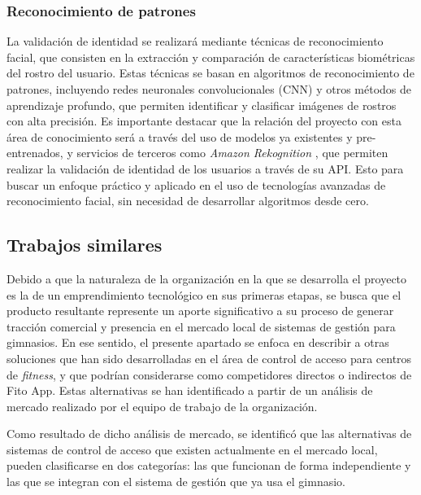 \subsubsection{Reconocimiento de patrones}
La validación de identidad se realizará mediante técnicas de reconocimiento facial, que consisten en la extracción y comparación de características biométricas del rostro del usuario. Estas técnicas se basan en algoritmos de reconocimiento de patrones, incluyendo redes neuronales convolucionales (CNN) y otros métodos de aprendizaje profundo, que permiten identificar y clasificar imágenes de rostros con alta precisión. Es importante destacar que la relación del proyecto con esta área de conocimiento será a través del uso de modelos ya existentes y pre-entrenados, y servicios de terceros como \textit{Amazon Rekognition} \cite{amazon_rekognition}, que permiten realizar la validación de identidad de los usuarios a través de su API. Esto para buscar un enfoque práctico y aplicado en el uso de tecnologías avanzadas de reconocimiento facial, sin necesidad de desarrollar algoritmos desde cero.

\subsection{Trabajos similares}


Debido a que la naturaleza de la organización en la que se desarrolla el proyecto es la de un emprendimiento tecnológico en sus primeras etapas, se busca que el producto resultante represente un aporte significativo a su proceso de generar tracción comercial y presencia en el mercado local de sistemas de gestión para gimnasios. En ese sentido, el presente apartado se enfoca en describir a otras soluciones que han sido desarrolladas en el área de control de acceso para centros de \textit{fitness}, y que podrían considerarse como competidores directos o indirectos de Fito App. Estas alternativas se han identificado a partir de un análisis de mercado realizado por el equipo de trabajo de la organización.


Como resultado de dicho análisis de mercado, se identificó que las alternativas de sistemas de control de acceso que existen actualmente en el mercado local, pueden clasificarse en dos categorías: las que funcionan de forma independiente y las que se integran con el sistema de gestión que ya usa el gimnasio. 

